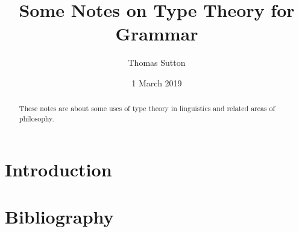 \documentclass[a4paper]{article}
\title{Some Notes on Type Theory for Grammar}
\author{Thomas Sutton}
\date{1 March 2019}
\begin{document}
\maketitle

\begin{abstract}
  These notes are about some uses of type theory in linguistics and related
  areas of philosophy.
\end{abstract}

\tableofcontents

\section{Introduction}

\section{Bibliography}

\nocite{*}

\printbibliography[heading=none]
\end{document}
